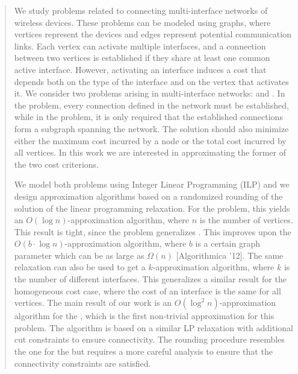 ﻿\begin{abstract}
We study problems related to connecting multi-interface networks of wireless devices. These problems can be modeled using graphs, where vertices represent the devices and edges represent potential communication  links. Each vertex can activate multiple interfaces, and a connection between two vertices is established if they share at least one common active interface.
However, activating an interface induces a cost that depends both on the type of the interface and on the vertex that activates it. We consider two problems arising in multi-interface networks: \coverage and \connectivity. In the \coverage problem, every connection defined in the network must be established, while in the \connectivity problem, it is only required that the established connections form a subgraph spanning the network. The solution should also minimize either the maximum cost incurred by a node or the total cost incurred by all vertices. In this work we are interested in approximating the former of the two cost criterions.

We model both problems using Integer Linear Programming (ILP) and we design approximation algorithms based on a randomized rounding of the solution of the linear programming relaxation. For the \coverage problem, this yields an $O(\log n)$-approximation algorithm, where $n$ is the number of vertices. This result is tight, since the problem generalizes \setcover. This improves upon the $O(b\cdot\log n)$-approximation algorithm, where $b$ is a certain graph parameter which can be as large as $\Omega(n)$ [Algorithmica '12]. The same relaxation can also be used to get a $k$-approximation algorithm, where $k$ is the number of different interfaces. This generalizes a similar result for the homogeneous cost case, where the cost of an interface is the same for all vertices.
The main result of our work is an $O(\log^2 n)$-approximation algorithm for the \connectivity, which is the first non-trivial approximation for this problem. The algorithm is based on a similar LP relaxation with additional cut constraints to ensure connectivity. The rounding procedure resembles the one for the \coverage but requires a more careful analysis to ensure that the connectivity constraints are satisfied.
\end{abstract}

